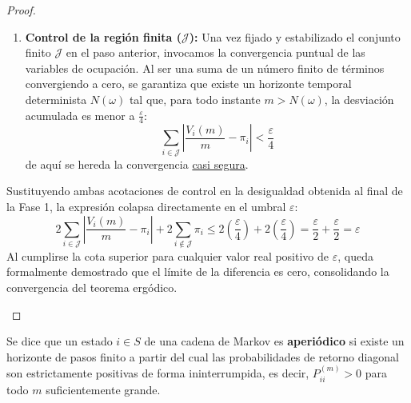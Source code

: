 \documentclass[10pt]{book}
\begin{document}
\begin{coro}
\begin{proof}
\begin{description}
\begin{enumerate}
            \item \textbf{Control de la región finita ($\mathcal{J}$):} Una vez fijado y estabilizado el conjunto finito $\mathcal{J}$ en el paso anterior, invocamos la convergencia puntual de las variables de ocupación. Al ser una suma de un número finito de términos convergiendo a cero, se garantiza que existe un horizonte temporal determinista $N(\omega)$ tal que, para todo instante $m > N(\omega)$, la desviación acumulada es menor a $\frac{\varepsilon}{4}$:
            \[
            \sum_{i \in \mathcal{J}} \left| \frac{V_i(m)}{m} - \pi_i \right| < \frac{\varepsilon}{4}
            \]
            de aquí se hereda la convergencia \underline{casi segura}.
        \end{enumerate}

        Sustituyendo ambas acotaciones de control en la desigualdad obtenida al final de la Fase 1, la expresión colapsa directamente en el umbral $\varepsilon$:
        \[
        2 \sum_{i \in \mathcal{J}} \left| \frac{V_i(m)}{m} - \pi_i \right| + 2 \sum_{i \notin \mathcal{J}} \pi_i \le 2 \left( \frac{\varepsilon}{4} \right) + 2 \left( \frac{\varepsilon}{4} \right) = \frac{\varepsilon}{2} + \frac{\varepsilon}{2} = \varepsilon
        \]
        Al cumplirse la cota superior para cualquier valor real positivo de $\varepsilon$, queda formalmente demostrado que el límite de la diferencia es cero, consolidando la convergencia del teorema ergódico.

\end{description}
\end{proof}
\end{coro}



\begin{definicion}
    Se dice que un estado $i \in S$ de una cadena de Markov es \textbf{aperiódico} si existe un horizonte de pasos finito a partir del cual las probabilidades de retorno diagonal son estrictamente positivas de forma ininterrumpida, es decir, $P_{ii}^{(m)} > 0$ para todo $m$ suficientemente grande.
\end{definicion}
\end{document}
